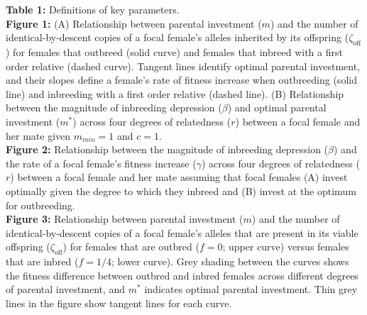 \documentclass[12pt]{article}
\begin{document}





\clearpage

\noindent \textbf{Table 1:}  Definitions of key parameters. \\

\noindent \textbf{Figure 1:} (A) Relationship between parental investment ($m$) and the number of identical-by-descent copies of a focal female's alleles inherited by its offspring ($\zeta_{\textrm{off}}$) for females that outbreed (solid curve) and females that inbreed with a first order relative (dashed curve). Tangent lines identify optimal parental investment, and their slopes define a female's rate of fitness increase when outbreeding (solid line) and inbreeding with a first order relative (dashed line). (B) Relationship between the magnitude of inbreeding depression ($\beta$) and optimal parental investment ($m^{*}$) across four degrees of relatedness ($r$) between a focal female and her mate given $m_{min}=1$ and $c=1$. \\ 

\noindent \textbf{Figure 2:} Relationship between the magnitude of inbreeding depression ($\beta$) and the rate of a focal female's fitness increase ($\gamma$) across four degrees of relatedness ($r$) between a focal female and her mate assuming that focal females (A) invest optimally given the degree to which they inbreed and (B) invest at the optimum for outbreeding. \\

\noindent \textbf{Figure 3:} Relationship between parental investment ($m$) and the number of identical-by-descent copies of a focal female's alleles that are present in its viable offspring ($\zeta_{\textrm{off}}$) for females that are outbred ($f=0$; upper curve) versus females that are inbred ($f=1/4$; lower curve). Grey shading between the curves shows the fitness difference between outbred and inbred females across different degrees of parental investment, and $m^{*}$ indicates optimal parental investment. Thin grey lines in the figure show tangent lines for each curve. \\
\end{document}
